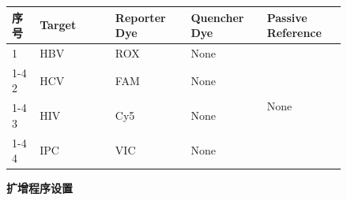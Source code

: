 \documentclass[UTF8,10pt,a4paper,fontset=fandol]{ctexart}
\newcommand{\fieldvalue}[1]{#1}
\newcommand{\handwritten}[1]{#1}
\begin{document}
\begin{tabular}{|p{0.07\linewidth}|p{0.19\linewidth}|p{0.19\linewidth}|p{0.19\linewidth}|p{0.20\linewidth}|}
\hline
序号 & Target & Reporter Dye & Quencher Dye & Passive Reference \\
\hline
1 &
\fieldvalue{\handwritten{HBV}} &
\fieldvalue{\handwritten{ROX}} &
\fieldvalue{\handwritten{None}} &
\multirow{4}{*}{
\fieldvalue{\handwritten{None}}}\\[-2mm]
\cline{1-4}
2 &
\fieldvalue{\handwritten{HCV}} &
\fieldvalue{\handwritten{FAM}} &
\fieldvalue{\handwritten{None}} &
\\
\cline{1-4}
3 &
\fieldvalue{\handwritten{HIV}} &
\fieldvalue{\handwritten{Cy5}} &
\fieldvalue{\handwritten{None}} &
\\
\cline{1-4}
4 &
\fieldvalue{\handwritten{IPC}} &
\fieldvalue{\handwritten{VIC}} &
\fieldvalue{\handwritten{None}} &
\\
\hline
\end{tabular}

\vspace{2mm}
\textbf{扩增程序设置}
\end{document}
